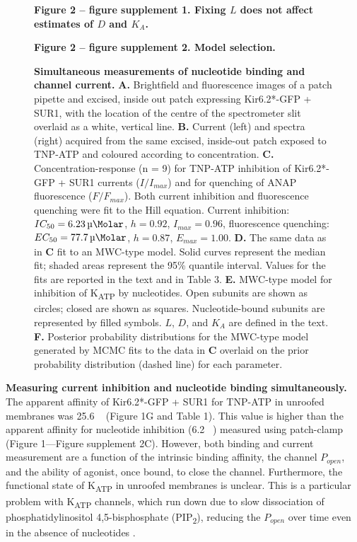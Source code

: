 \documentclass[10pt,lineno, doublespacing]{elife_modified}
\begin{document}
\begin{figure}\ContinuedFloat
\begin{fullwidth}
\caption{
\textbf{Simultaneous measurements of nucleotide binding and channel current.}
\textbf{A.}
Brightfield and fluorescence images of a patch pipette and excised, inside out patch expressing Kir6.2*-GFP + SUR1, with the location of the centre of the spectrometer slit overlaid as a white, vertical line.
\textbf{B.}
Current (left) and spectra (right) acquired from the same excised, inside-out patch exposed to TNP-ATP and coloured according to concentration.
\textbf{C.}
Concentration-response (n = 9) for TNP-ATP inhibition of Kir6.2*-GFP + SUR1 currents ($I/I_{max}$) and for quenching of ANAP fluorescence ($F/F_{max}$).
Both current inhibition and fluorescence quenching were fit to the Hill equation.
Current inhibition: $IC_{50} = \SI{6.23}{\micro\Molar}$, $h = 0.92$, $I_{max} = 0.96$, fluorescence quenching: $EC_{50} = \SI{77.7}{\micro\Molar}$, $h = 0.87$, $E_{max} = 1.00$.
\textbf{D.}
The same data as in \textbf{C} fit to an MWC-type model.
Solid curves represent the median fit; shaded areas represent the 95\% quantile interval.
Values for the fits are reported in the text and in Table 3.
\textbf{E.}
MWC-type model for inhibition of K\textsubscript{ATP} by nucleotides.
Open subunits are shown as circles; closed are shown as squares.
Nucleotide-bound subunits are represented by filled symbols. $L$, $D$, and $K_A$ are defined in the text.
\textbf{F.}
Posterior probability distributions for the MWC-type model generated by MCMC fits to the data in \textbf{C} overlaid on the prior probability distribution (dashed line) for each parameter.
}
\raggedright
\textbf{\small Figure 2 -- figure supplement 1. Fixing $L$ does not affect estimates of $D$ and $K_A$.}

\textbf{\small Figure 2 -- figure supplement 2. Model selection.}
\end{fullwidth}
\end{figure}

\textbf{Measuring current inhibition and nucleotide binding simultaneously.}
The apparent affinity of Kir6.2*-GFP + SUR1 for TNP-ATP in unroofed membranes was 25.6 \si{\micro\Molar} (Figure 1G and Table 1).
This value is higher than the apparent affinity for nucleotide inhibition (6.2 \si{\micro\Molar}) measured using patch-clamp (Figure 1—Figure supplement 2C).
However, both binding and current measurement are a function of the intrinsic binding affinity, the channel $P_{open}$, and the ability of agonist, once bound, to close the channel.
Furthermore, the functional state of K\textsubscript{ATP} in unroofed membranes is unclear. This is a particular problem with K\textsubscript{ATP} channels, which run down due to slow dissociation of phosphatidylinositol 4,5-bisphosphate (PIP\textsubscript{2}), reducing the $P_{open}$ over time even in the absence of nucleotides \citep{RN51}.
\end{document}
